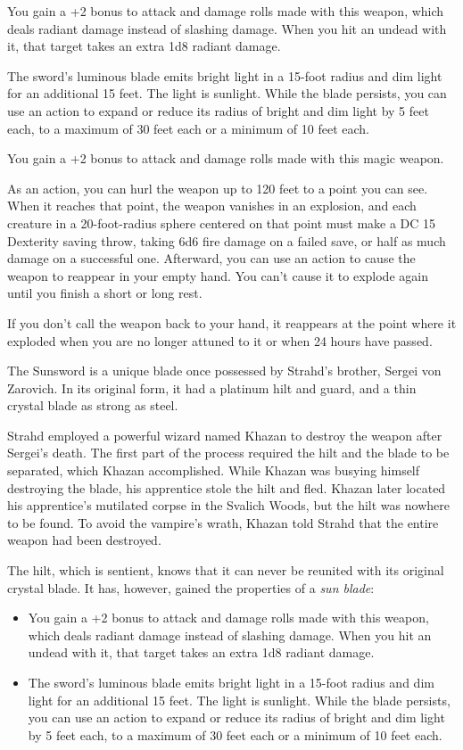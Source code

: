 \documentclass[10pt,a4paper,twoside,bg=print,twocolumn,openany,nodeprecatedcode]{dndbook}
\begin{document}
You gain a +2 bonus to attack and damage rolls made with this weapon, which deals radiant damage instead of slashing damage. When you hit an undead with it, that target takes an extra 1d8 radiant damage.

The sword's luminous blade emits bright light in a 15-foot radius and dim light for an additional 15 feet. The light is sunlight. While the blade persists, you can use an action to expand or reduce its radius of bright and dim light by 5 feet each, to a maximum of 30 feet each or a minimum of 10 feet each.

You gain a +2 bonus to attack and damage rolls made with this magic weapon.

As an action, you can hurl the weapon up to 120 feet to a point you can see. When it reaches that point, the weapon vanishes in an explosion, and each creature in a 20-foot-radius sphere centered on that point must make a DC 15 Dexterity saving throw, taking 6d6 fire damage on a failed save, or half as much damage on a successful one. Afterward, you can use an action to cause the weapon to reappear in your empty hand. You can't cause it to explode again until you finish a short or long rest.

If you don't call the weapon back to your hand, it reappears at the point where it exploded when you are no longer attuned to it or when 24 hours have passed.

The Sunsword is a unique blade once possessed by Strahd's brother, Sergei von Zarovich. In its original form, it had a platinum hilt and guard, and a thin crystal blade as strong as steel.

Strahd employed a powerful wizard named Khazan to destroy the weapon after Sergei's death. The first part of the process required the hilt and the blade to be separated, which Khazan accomplished. While Khazan was busying himself destroying the blade, his apprentice stole the hilt and fled. Khazan later located his apprentice's mutilated corpse in the Svalich Woods, but the hilt was nowhere to be found. To avoid the vampire's wrath, Khazan told Strahd that the entire weapon had been destroyed.

The hilt, which is sentient, knows that it can never be reunited with its original crystal blade. It has, however, gained the properties of a \textit{sun blade}:


\begin{itemize}
\item You gain a +2 bonus to attack and damage rolls made with this weapon, which deals radiant damage instead of slashing damage. When you hit an undead with it, that target takes an extra 1d8 radiant damage.
\item The sword's luminous blade emits bright light in a 15-foot radius and dim light for an additional 15 feet. The light is sunlight. While the blade persists, you can use an action to expand or reduce its radius of bright and dim light by 5 feet each, to a maximum of 30 feet each or a minimum of 10 feet each.
\end{itemize}
\end{document}
